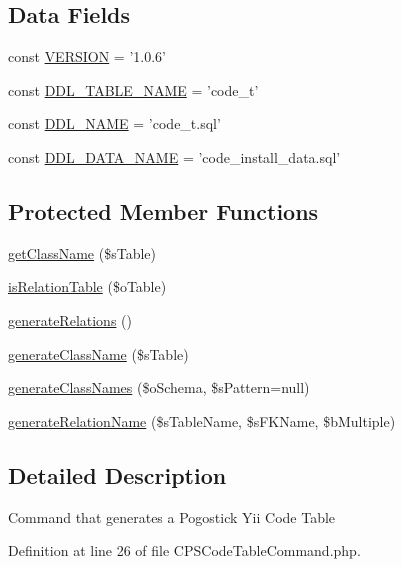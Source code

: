 \subsection*{Data Fields}
\begin{DoxyCompactItemize}
\item 
const \hyperlink{classCPSCodeTableCommand_af71005841ce53adac00581ab0ba24c1f}{VERSION} = '1.0.6'
\item 
const \hyperlink{classCPSCodeTableCommand_aab7e20a5077f2a3b17ab9ae1ca8bd744}{DDL\_\-TABLE\_\-NAME} = 'code\_\-t'
\item 
const \hyperlink{classCPSCodeTableCommand_a1e548fb71c67f7f778a311f3019b9ff3}{DDL\_\-NAME} = 'code\_\-t.sql'
\item 
const \hyperlink{classCPSCodeTableCommand_ac4ef63ea01237fca6e5977e7cf0ad6fa}{DDL\_\-DATA\_\-NAME} = 'code\_\-install\_\-data.sql'
\end{DoxyCompactItemize}
\subsection*{Protected Member Functions}
\begin{DoxyCompactItemize}
\item 
\hyperlink{classCPSCodeTableCommand_a9bc05d24f230cd747c52f296785addf7}{getClassName} (\$sTable)
\item 
\hyperlink{classCPSCodeTableCommand_a44e4634608e647ea2224d25ecb599087}{isRelationTable} (\$oTable)
\item 
\hyperlink{classCPSCodeTableCommand_a6e265367e1344ab4817a0f31a6025892}{generateRelations} ()
\item 
\hyperlink{classCPSCodeTableCommand_af175be165627c37bf50c6332fa2c6fed}{generateClassName} (\$sTable)
\item 
\hyperlink{classCPSCodeTableCommand_a89ac3c8019aec5f4b1b91f5e1203ce1c}{generateClassNames} (\$oSchema, \$sPattern=null)
\item 
\hyperlink{classCPSCodeTableCommand_aa2e3086ca2c90c8a7cd1bd18fc7f39b7}{generateRelationName} (\$sTableName, \$sFKName, \$bMultiple)
\end{DoxyCompactItemize}


\subsection{Detailed Description}
Command that generates a Pogostick Yii Code Table 

Definition at line 26 of file CPSCodeTableCommand.php.



